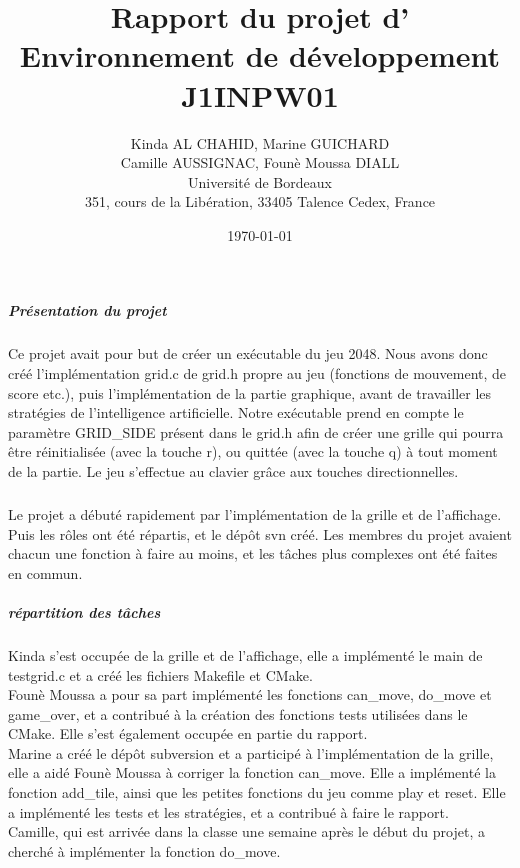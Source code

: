 \documentclass{report}
\title{Rapport du projet d' Environnement de développement J1INPW01}
\author{Kinda AL CHAHID, Marine GUICHARD \\ Camille AUSSIGNAC, Founè Moussa DIALL\\
Université de Bordeaux \\ 
351, cours de la Libération, 33405 Talence Cedex, France}
\date{\today}
\begin{document}
\maketitle



\tableofcontents

\chapter*{}

\paragraph{Présentation du projet} Ce projet avait pour but de créer un exécutable du jeu 2048. Nous avons donc créé l'implémentation grid.c de grid.h propre au jeu (fonctions de mouvement, de score etc.), puis l'implémentation de la partie graphique, avant de travailler les stratégies de l'intelligence artificielle. Notre exécutable prend en compte le paramètre GRID{\_}SIDE présent dans le grid.h afin de créer une grille qui pourra être réinitialisée (avec la touche r), ou quittée (avec la touche q) à tout moment de la partie. Le jeu s'effectue au clavier grâce aux touches directionnelles.


\paragraph{}Le projet a débuté rapidement par l'implémentation de la grille et de l'affichage. Puis les rôles ont été répartis, et le dépôt svn créé. Les membres du projet avaient chacun une fonction à faire au moins, et les tâches plus complexes ont été faites en commun.

\paragraph{répartition des tâches}
Kinda s'est occupée de la grille et de l'affichage, elle a implémenté le main de testgrid.c et a créé les fichiers Makefile et CMake.\\
Founè Moussa a pour sa part implémenté les fonctions can{\_}move, do{\_}move et game{\_}over, et a contribué à la création des fonctions tests utilisées dans le CMake. Elle s'est également occupée en partie du rapport.\\
Marine a créé le dépôt subversion et a participé à l'implémentation de la grille, elle a aidé Founè Moussa à corriger la fonction can{\_}move. Elle a implémenté la fonction add{\_}tile, ainsi que les petites fonctions du jeu comme play et reset. Elle a implémenté les tests et les stratégies, et a contribué à faire le rapport.\\
Camille, qui est arrivée dans la classe une semaine après le début du projet, a cherché à implémenter la fonction do{\_}move.
\end{document}
